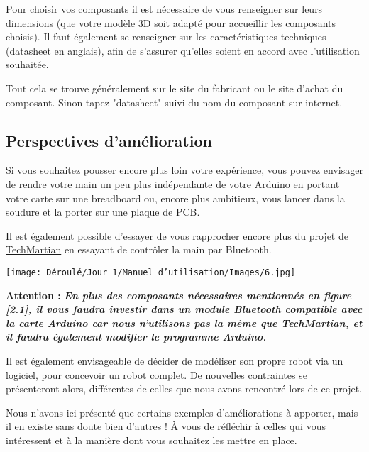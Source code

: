 \begin{flushleft}
    Pour choisir vos composants il est nécessaire de vous renseigner sur leurs dimensions (que votre modèle 3D soit adapté pour accueillir les composants choisis). Il faut également se renseigner sur les caractéristiques techniques (datasheet en anglais), afin de s'assurer qu'elles soient en accord avec l'utilisation souhaitée.
    
    Tout cela se trouve généralement sur le site du fabricant ou le site d'achat du composant. Sinon tapez "datasheet" suivi du nom du composant sur internet.
\end{flushleft}


\subsection{Perspectives d'amélioration}

\begin{flushleft}
    Si vous souhaitez pousser encore plus loin votre expérience, vous pouvez envisager de rendre votre main un peu plus indépendante de votre Arduino en portant votre carte sur une breadboard ou, encore plus ambitieux, vous lancer dans la soudure et la porter sur une plaque de PCB. 
    
    Il est également possible d'essayer de vous rapprocher encore plus du projet de \href{https://www.instructables.com/3D-Printed-Robotic-Hand/}{TechMartian} en essayant de contrôler la main par Bluetooth.
    
    \begin{multicols}{2}
    \texttt{[image: Déroulé/Jour\_1/Manuel d'utilisation/Images/6.jpg]}
    
    \columnbreak
    
\textbf{\large Attention : }\textbf{\textit{En plus des composants         nécessaires mentionnés en figure \ref{2.1}, il vous faudra investir     dans un module Bluetooth compatible avec la carte Arduino car nous     n'utilisons pas la même que TechMartian, et il faudra également        modifier le programme Arduino.}}\\
\end{multicols}

Il est également envisageable de décider de modéliser son propre robot via un logiciel, pour concevoir un robot complet. De nouvelles contraintes se présenteront alors, différentes de celles que nous avons rencontré lors de ce projet.

Nous n'avons ici présenté que certains exemples d'améliorations à apporter, mais il en existe sans doute bien d'autres ! \`A vous de réfléchir à celles qui vous intéressent et à la manière dont vous souhaitez les mettre en place. 
\end{flushleft}

